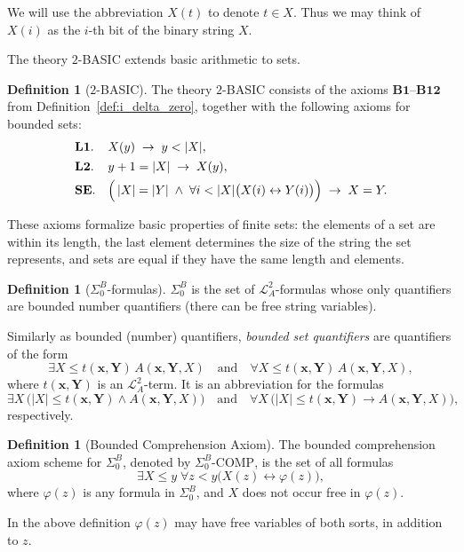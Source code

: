 \documentclass{article}
\theoremstyle{plain}
\theoremstyle{definition}
\newtheorem{definition}[theorem]{Definition}
\newcommand{\tuple}{\mathbf}
\begin{document}
We will use the abbreviation
$X(t)$ to denote $t \in X$. Thus we may think of $X(i)$ as the
$i$-th bit of the binary string $X$.

The theory $2$-BASIC extends basic arithmetic to sets. 

\begin{definition}[$2$-BASIC]
The theory $2$-BASIC consists of the axioms \linebreak $\mathbf{B1\text{--}B12}$ from
Definition~\ref{def:i_delta_zero}, together with the following axioms
for bounded sets:
\[
\begin{array}{lll}
\mathbf{L1}. & X(y) \;\rightarrow\; y < |X|, \\[4pt]
\mathbf{L2}. & y + 1 = |X| \;\rightarrow\; X(y), \\[4pt]
\mathbf{SE}. &
\Bigl(\,|X| = |Y| \;\land\; \forall i < |X|\bigl(X(i) \leftrightarrow Y(i)\bigr)\Bigr)
\;\rightarrow\; X = Y .
\end{array}
\]
\end{definition}

These axioms formalize basic properties of finite sets: the elements of a set are within its length, the last element determines the size of the string the set represents, and sets are equal if they have the same length and elements.

\begin{definition}[$\Sigma_0^B$-formulas]
$\Sigma_0^B$ is the set of $\mathcal{L}_A^2$-formulas whose
only quantifiers are bounded number quantifiers (there can be free string variables).

\end{definition}

Similarly as bounded (number) quantifiers, \emph{bounded set quantifiers}  are quantifiers of the form
\[
\exists X \le t(\tuple x, \tuple Y)\, A(\tuple x, \tuple Y, X)
\quad\text{and}\quad
\forall X \le t(\tuple x, \tuple Y)\, A(\tuple x, \tuple Y, X),
\]
where $t(\tuple x, \tuple Y)$ is an $\mathcal{L}_A^2$-term. It is an abbreviation for the formulas
\[
\exists X\,\bigl(|X| \le t(\tuple x, \tuple Y)\wedge A(\tuple x, \tuple Y, X)\bigr)
\quad\text{and}\quad
\forall X\,\bigl(|X| \le t(\tuple x, \tuple Y)\to A(\tuple x, \tuple Y, X)\bigr),
\]
respectively.


\begin{definition}[Bounded Comprehension Axiom]
The bounded comprehension axiom scheme for $\Sigma^B_0$, denoted by $\Sigma^B_0\text{-COMP}$, is the set of all formulas
\[
\exists X \le y \; \forall z < y \bigl( X(z) \leftrightarrow \varphi(z) \bigr),
\]
where $\varphi(z)$ is any formula in $\Sigma^B_0$, and $X$ does not occur free in $\varphi(z)$.

In the above definition $\varphi(z)$ may have free variables of both sorts, in addition to $z$.
\end{definition}
\end{document}
